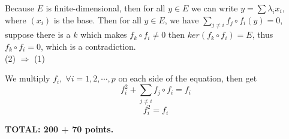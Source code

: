 \documentclass[12pt]{article}
\begin{document}
Because $E$ is finite-dimensional, then for all $y \in E$ we can write $y = \sum \lambda_i x_i$, where $(x_i)$ is the base. Then for all $y \in E$, we have $ \sum_{j \neq i} f_j \circ f_i (y) = 0$, suppose there is a $k$ which makes $ f_k \circ f_i \neq 0 $ then $ker( f_k \circ f_i ) = E$, thus $ f_k \circ f_i  = 0$, which is a contradiction. \\

(2) $\Rightarrow$ (1)

We multiply $f_i, \; \forall i = 1,2,\cdots, p$ on each side of the equation, then get 
\[
f_i^2 + \sum_{j \neq i} f_j \circ f_i = f_i
\]
\[
 f_i^2 = f_i
\]


\vspace{0.5cm}\noindent
{\bf TOTAL: 200  + 70 points.}
\end{document}
